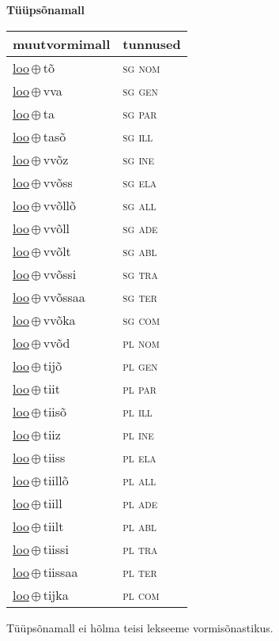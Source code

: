 

\vspace{3.5em}
\noindent \begin{minipage}{\textwidth}
\noindent \textbf{Tüüpsõnamall \,}\\

\begin{sideways}
\begin{tabular}{l l}
muutvormimall & tunnused \\
\hline
\underline{loo}\,$\oplus$\,tõ & \textsc{ sg nom } \\
\underline{loo}\,$\oplus$\,vva & \textsc{ sg gen } \\
\underline{loo}\,$\oplus$\,ta & \textsc{ sg par } \\
\underline{loo}\,$\oplus$\,tasõ & \textsc{ sg ill } \\
\underline{loo}\,$\oplus$\,vvõz & \textsc{ sg ine } \\
\underline{loo}\,$\oplus$\,vvõss & \textsc{ sg ela } \\
\underline{loo}\,$\oplus$\,vvõllõ & \textsc{ sg all } \\
\underline{loo}\,$\oplus$\,vvõll & \textsc{ sg ade } \\
\underline{loo}\,$\oplus$\,vvõlt & \textsc{ sg abl } \\
\underline{loo}\,$\oplus$\,vvõssi & \textsc{ sg tra } \\
\underline{loo}\,$\oplus$\,vvõssaa & \textsc{ sg ter } \\
\underline{loo}\,$\oplus$\,vvõka & \textsc{ sg com } \\
\underline{loo}\,$\oplus$\,vvõd & \textsc{ pl nom } \\
\underline{loo}\,$\oplus$\,tijõ & \textsc{ pl gen } \\
\underline{loo}\,$\oplus$\,tiit & \textsc{ pl par } \\
\underline{loo}\,$\oplus$\,tiisõ & \textsc{ pl ill } \\
\underline{loo}\,$\oplus$\,tiiz & \textsc{ pl ine } \\
\underline{loo}\,$\oplus$\,tiiss & \textsc{ pl ela } \\
\underline{loo}\,$\oplus$\,tiillõ & \textsc{ pl all } \\
\underline{loo}\,$\oplus$\,tiill & \textsc{ pl ade } \\
\underline{loo}\,$\oplus$\,tiilt & \textsc{ pl abl } \\
\underline{loo}\,$\oplus$\,tiissi & \textsc{ pl tra } \\
\underline{loo}\,$\oplus$\,tiissaa & \textsc{ pl ter } \\
\underline{loo}\,$\oplus$\,tijka & \textsc{ pl com } \\
\end{tabular}
\end{sideways}
\label{tab:tüüpsõnamall-lootõ}

\end{minipage}

 
\vspace{1em}
\noindent Tüüpsõnamall  ei hõlma teisi lekseeme vormi\-sõnastikus.
